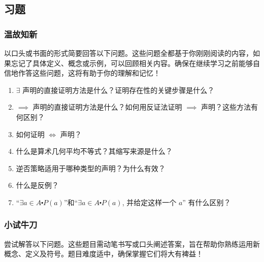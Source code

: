 \subsection{习题}\label{sec:section4.9.9}

\subsubsection*{温故知新}

以口头或书面的形式简要回答以下问题。这些问题全都基于你刚刚阅读的内容，如果忘记了具体定义、概念或示例，可以回顾相关内容。确保在继续学习之前能够自信地作答这些问题，这将有助于你的理解和记忆！

\begin{enumerate}[label=(\arabic*)]
    \item $\exists$ 声明的直接证明方法是什么？证明存在性的关键步骤是什么？
    \item $\implies$ 声明的直接证明方法是什么？如何用反证法证明 $\implies$ 声明？这些方法有何区别？
    \item 如何证明 $\iff$ 声明？
    \item 什么是算术几何平均不等式？其缩写来源是什么？
    \item 逆否策略适用于哪种类型的声明？为什么有效？
    \item 什么是反例？
    \item ``$\exists a \in A \centerdot P(a)$''和``$\exists a \in A \centerdot P(a)$, 并给定这样一个 $a$'' 有什么区别？
\end{enumerate}

\subsubsection*{小试牛刀}

尝试解答以下问题。这些题目需动笔书写或口头阐述答案，旨在帮助你熟练运用新概念、定义及符号。题目难度适中，确保掌握它们将大有裨益！


